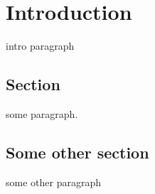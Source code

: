 \chapter{Introduction\label{chap:introduction}}
  intro paragraph

  \section{Section}
    some paragraph. \cite{einstein}

  \section{Some other section}
    some other paragraph
